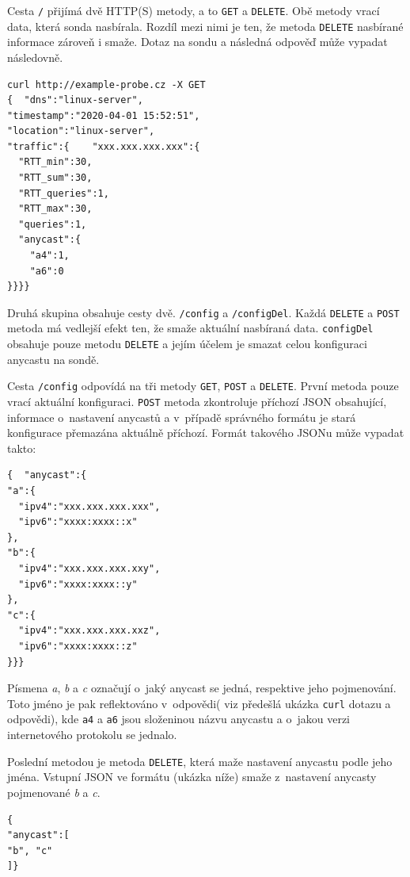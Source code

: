 \documentclass[thesis=M,czech]{src/FITthesis}[2019/12/23]
\begin{document}
Cesta \texttt{/} přijímá dvě HTTP(S) metody, a to \texttt{GET} a \texttt{DELETE}. Obě metody vrací data, která sonda nasbírala. Rozdíl mezi nimi je ten, že metoda \texttt{DELETE} nasbírané informace zároveň i smaže. Dotaz na sondu a následná odpověď může vypadat následovně. 

\begin{verbatim}
curl http://example-probe.cz -X GET
{  "dns":"linux-server",
"timestamp":"2020-04-01 15:52:51",
"location":"linux-server",
"traffic":{    "xxx.xxx.xxx.xxx":{      
  "RTT_min":30,
  "RTT_sum":30,
  "RTT_queries":1,
  "RTT_max":30,
  "queries":1,
  "anycast":{
    "a4":1,
    "a6":0    
}}}}
\end{verbatim}

Druhá skupina obsahuje cesty dvě. \texttt{/config} a \texttt{/configDel}. Každá \texttt{DELETE} a \texttt{POST} metoda má vedlejší efekt ten, že smaže aktuální nasbíraná data. \linebreak \texttt{configDel} obsahuje pouze metodu \texttt{DELETE} a jejím účelem je smazat celou konfiguraci anycastu na sondě. 

Cesta \texttt{/config} odpovídá na tři metody \texttt{GET}, \texttt{POST} a \texttt{DELETE}. První metoda pouze vrací aktuální konfiguraci. \texttt{POST} metoda zkontroluje příchozí JSON obsahující, informace o~nastavení anycastů a v~případě správného formátu je stará konfigurace přemazána aktuálně příchozí. Formát takového JSONu může vypadat takto:

\begin{verbatim}
{  "anycast":{
"a":{
  "ipv4":"xxx.xxx.xxx.xxx",
  "ipv6":"xxxx:xxxx::x"
},
"b":{
  "ipv4":"xxx.xxx.xxx.xxy",
  "ipv6":"xxxx:xxxx::y"
},
"c":{
  "ipv4":"xxx.xxx.xxx.xxz",
  "ipv6":"xxxx:xxxx::z"
}}}
\end{verbatim}

Písmena \textit{a}, \textit{b} a \textit{c} označují o~jaký anycast se jedná, respektive jeho pojmenování. Toto jméno je pak reflektováno v~odpovědi( viz předešlá ukázka \texttt{curl} dotazu a odpovědi), kde \texttt{a4} a \texttt{a6} jsou složeninou názvu anycastu a o~jakou verzi internetového protokolu se jednalo. 

Poslední metodou je metoda \texttt{DELETE}, která maže nastavení anycastu podle jeho jména. Vstupní JSON ve formátu (ukázka níže) smaže z~nastavení anycasty pojmenované \textit{b} a \textit{c}.
\begin{verbatim}
{
"anycast":[
"b", "c"
]}
\end{verbatim}
\end{document}
